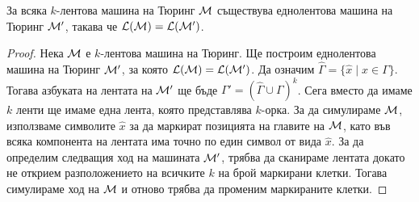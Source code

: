 \begin{prop}
  За всяка $k$-лентова машина на Тюринг $\mathcal{M}$ съществува еднолентова машина на Тюринг $\mathcal{M}'$,
  такава че $\mathcal{L}(\mathcal{M}) = \mathcal{L}(\mathcal{M}')$.
\end{prop}
\begin{proof}
  Нека $\mathcal{M}$ е $k$-лентова машина на Тюринг.
  Ще построим еднолентова машина на Тюринг $\mathcal{M}'$, за която $\mathcal{L}(\mathcal{M}) = \mathcal{L}(\mathcal{M}')$.
  Да означим $\hat\Gamma = \{\hat x \mid x \in \Gamma\}$.
  Тогава азбуката на лентата на $\mathcal{M}'$ ще бъде $\Gamma' = (\hat\Gamma \cup \Gamma)^{k}$.
  Сега вместо да имаме $k$ ленти ще имаме една лента, която представлява $k$-орка.
  За да симулираме $\mathcal{M}$, използваме символите $\hat x$ за да маркират позицията на главите на $\mathcal{M}$,
  като във всяка компонента на лентата има точно по един символ от вида $\hat x$.
  За да определим следващия ход на машината $\mathcal{M}'$, трябва да сканираме лентата докато не 
  открием разположението на всичките $k$ на брой маркирани клетки. Тогава симулираме ход на $\mathcal{M}$
  и отново трябва да променим маркираните клетки.
\end{proof}

